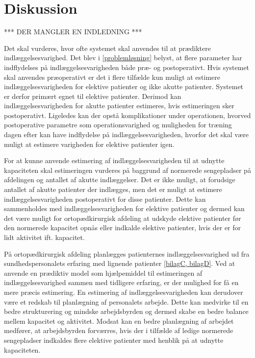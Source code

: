 \section{Diskussion}
*** DER MANGLER EN INDLEDNING ***

Det skal vurderes, hvor ofte systemet skal anvendes til at prædiktere indlæggelsesvarighed. Det blev i \ref{problemløsning} belyst, at flere parameter har indflydelses på indlæggelsesvarigheden både præ- og postoperativt. Hvis systemet skal anvendes præoperativt er det i flere tilfælde kun muligt at estimere indlæggelsesvarigheden for elektive patienter og ikke akutte patienter. Systemet er derfor primært egnet til elektive patienter. Derimod kan indlæggelsesvarigheden for akutte patienter estimeres, hvis estimeringen sker postoperativt. Ligeledes kan der opstå komplikationer under operationen, hvorved postoperative parametre som operationsvarighed  og muligheden for træning dagen efter kan have indflydelse på indlæggelsesvarigheden, hvorfor det skal være muligt at estimere varigheden for elektive patienter igen. 


For at kunne anvende estimering af indlæggelsesvarigheden til at udnytte kapaciteten skal estimeringen vurderes på baggrund af normerede sengepladser på afdelingen og antallet af akutte indlæggelser. Det er ikke muligt, at forudsige antallet af akutte patienter der indlægges, men det er muligt at estimere indlæggelsesvarigheden postoperativt for disse patienter. Dette kan sammenholdes med indlæggelsesvarigheden for elektive patienter og dermed kan det være muligt for ortopædkirurgisk afdeling at udskyde elektive patienter før den normerede kapacitet opnås eller indkalde elektive patienter, hvis der er for lidt aktivitet ift. kapacitet.


\noindent
På ortopædkirurgisk afdeling planlægges patienternes indlæggelsesvarighed ud fra sundhedspersonalets erfaring med lignende patienter \ref{bilagC, bilagD}. Ved at anvende en prædiktiv model som hjælpemiddel til estimeringen af indlæggelsesvarighed sammen med tidligere erfaring, er der mulighed for få en mere præcis estimering. 
En estimering af indlæggelsesvarigheden kan  derudover være et redskab til planlægning af personalets arbejde. Dette kan medvirke til en bedre strukturering og mindske arbejdsbyrden og dermed skabe en bedre balance mellem kapacitet og aktivitet. Modsat kan en bedre planlægning af arbejdet medfører, at arbejdsbyrden forværres, hvis der i tilfælde af ledige normerede sengepladser indkaldes flere elektive patienter med henblik på at udnytte kapaciteten. 


